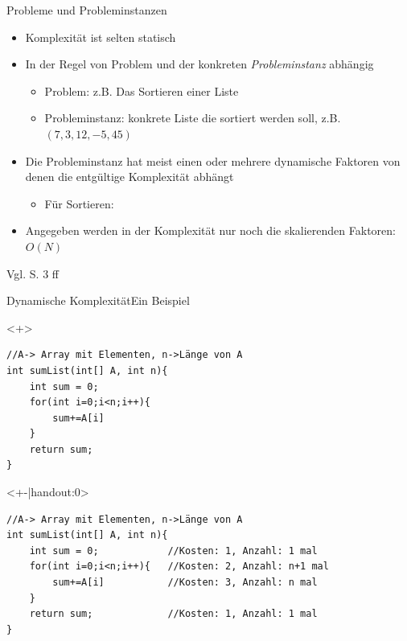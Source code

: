 \begin{frame}{Probleme und Probleminstanzen}
    \begin{itemize}[<+->]
        \item Komplexität ist selten statisch
        \item In der Regel von Problem und der konkreten \textit{Probleminstanz} abhängig
        \begin{itemize}
            \item Problem: z.B. Das Sortieren einer Liste
            \item Probleminstanz: konkrete Liste die sortiert werden soll, z.B. $(7, 3, 12, -5, 45)$
        \end{itemize}
        \item Die Probleminstanz hat meist einen oder mehrere dynamische Faktoren von denen die entgültige Komplexität abhängt
        \begin{itemize}
            \item Für Sortieren: 
        \end{itemize}
        \item Angegeben werden in der Komplexität nur noch die skalierenden Faktoren: $O(N)$
    \end{itemize}
    
    Vgl. \cite{ottmann2017} S. 3 ff
\end{frame}

\begin{frame}[fragile]{Dynamische Komplexität}{Ein Beispiel}
\lstset{style=java}
\begin{onlyenv}<+>
\begin{lstlisting}
//A-> Array mit Elementen, n->Länge von A
int sumList(int[] A, int n){
    int sum = 0;
    for(int i=0;i<n;i++){
        sum+=A[i]
    }
    return sum;
}
\end{lstlisting}
\end{onlyenv}

\begin{onlyenv}<+-|handout:0>
\begin{lstlisting}
//A-> Array mit Elementen, n->Länge von A
int sumList(int[] A, int n){
    int sum = 0;            //Kosten: 1, Anzahl: 1 mal
    for(int i=0;i<n;i++){   //Kosten: 2, Anzahl: n+1 mal
        sum+=A[i]           //Kosten: 3, Anzahl: n mal
    }
    return sum;             //Kosten: 1, Anzahl: 1 mal
}
\end{lstlisting}
\end{onlyenv}





\end{frame}


